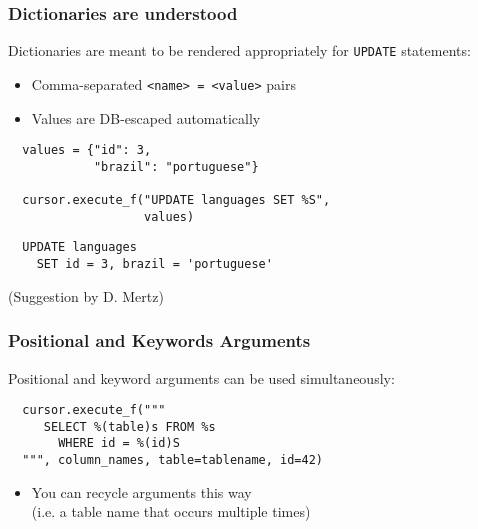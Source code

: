 \documentclass{beamer}
\begin{document}
\begin{frame}[fragile]
  \frametitle{Dictionaries are understood}

  Dictionaries are meant to be rendered appropriately for \texttt{UPDATE}
  statements:
  \begin{itemize}
  \item Comma-separated \texttt{<name> = <value>} pairs
  \item Values are DB-escaped automatically
  \end{itemize}

\begin{verbatim}
  values = {"id": 3, 
            "brazil": "portuguese"}

  cursor.execute_f("UPDATE languages SET %S", 
                   values)
\end{verbatim}
\vfill

\begin{verbatim}
  UPDATE languages 
    SET id = 3, brazil = 'portuguese'
\end{verbatim}
\vfill

(Suggestion by D. Mertz)

\end{frame}



\begin{frame}[fragile]
  \frametitle{Positional and Keywords Arguments}

  Positional and keyword arguments can be used simultaneously:

\begin{verbatim}
  cursor.execute_f("""
     SELECT %(table)s FROM %s 
       WHERE id = %(id)S
  """, column_names, table=tablename, id=42)
\end{verbatim}

\begin{itemize}
\item You can recycle arguments this way \\
(i.e. a table name that occurs multiple times)
\end{itemize}


\end{frame}
\end{document}
